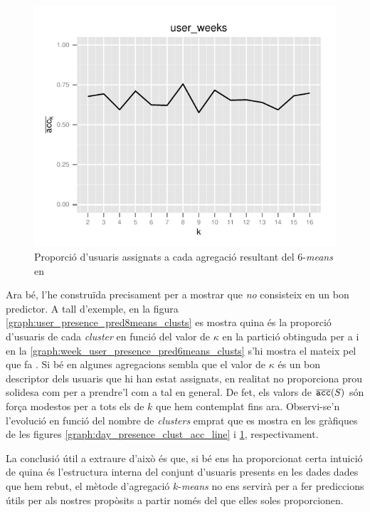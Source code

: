 \documentclass[
	a4paper,
	twoside,
	justified
]{tufte-book}
\begin{document}
\begin{figure}
\begin{center}
\includegraphics{week_presence_clust_acc_line}
\caption{
\label{graph:week_presence_clust_acc_line}
	Proporció d'usuaris assignats a cada agregació resultant del 6-\emph{means} en  
}
\end{center}
\end{figure}
Ara bé, l'he construïda precisament per a mostrar que \emph{no} consisteix en un bon predictor. A tall d'exemple, en la figura \ref{graph:user_presence_pred8means_clusts} es mostra quina és la proporció d'usuaris de cada \emph{cluster} en funció del valor de $\kappa$ en la partició obtinguda per a  i en la \ref{graph:week_user_presence_pred6means_clusts} s'hi mostra el mateix pel que fa . Si bé en algunes agregacions sembla que el valor de $\kappa$ és un bon descriptor dels usuaris que hi han estat assignats, en realitat no proporciona prou solidesa com per a prendre'l com a tal en general. De fet, els valors de $\overline{\texttt{acc}}(S)$ són força modestos per a tots els de $k$ que hem contemplat fins ara. Observi-se'n l'evolució en funció del nombre de \emph{clusters} emprat que es mostra en les gràfiques de les figures \ref{graph:day_presence_clust_acc_line} i \ref{graph:week_presence_clust_acc_line}, respectivament.

La conclusió útil a extraure d'això és que, si bé ens ha proporcionat certa intuició de quina és l'estructura interna del conjunt d'usuaris presents en les dades dades que hem rebut, el mètode d'agregació $k$-\emph{means} no ens servirà per a fer prediccions útils per als nostres propòsits a partir només del que elles soles proporcionen.
\end{document}
